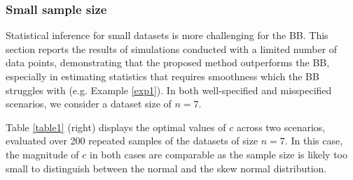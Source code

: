 \documentclass[11pt,a4paper]{article}
\theoremstyle{plain}
\theoremstyle{remark}
\theoremstyle{remark}
\begin{document}
\subsubsection{Small sample size}
Statistical inference for small datasets is  more challenging for the BB. This section reports the results of simulations conducted with a limited number of data points, demonstrating that the proposed method outperforms the BB, especially in estimating statistics that requires smoothness which the BB struggles with (e.g. Example \ref{exp1}). In both well-specified and misspecified scenarios, we consider a dataset size of $n = 7$.

Table \ref{table1} (right) displays the optimal values of $c$ across two scenarios, evaluated over 200 repeated samples of the datasets of size $n = 7$. In this case, the magnitude of $c$ in both cases are comparable as the sample size is likely too small to distinguish between the normal and the skew normal distribution.
\end{document}
